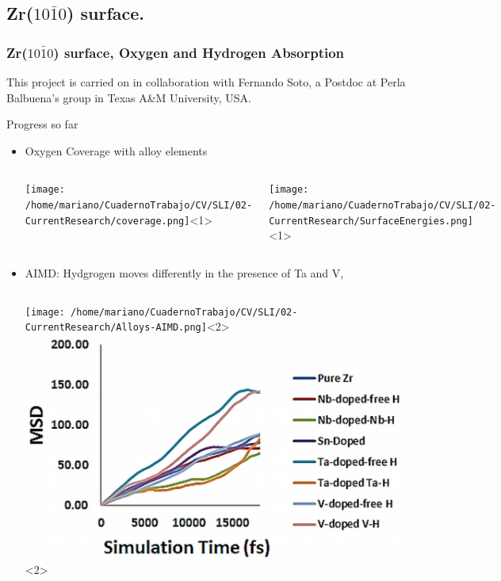 \subsection{Zr($10\bar{1}0$) surface.}
\begin{frame}[t]
\frametitle{Zr($10\bar{1}0$) surface, Oxygen and Hydrogen Absorption}

\small
  This project is carried on in collaboration with Fernando Soto, a Postdoc at 
  Perla Balbuena's group in Texas A\&M University, USA.
  \par
  \vspace{0.5cm}
  Progress so far
  \begin{itemize}
      \item<1-> Oxygen Coverage with alloy elements
	\begin{columns}[c]
	  \centering
	  \texttt{[image: /home/mariano/CuadernoTrabajo/CV/SLI/02-CurrentResearch/coverage.png]}<1>
	  \par
	  \centering
	  \texttt{[image: /home/mariano/CuadernoTrabajo/CV/SLI/02-CurrentResearch/SurfaceEnergies.png]}<1>
	  \par
	\end{columns}
      \item<2> AIMD: Hydgrogen moves differently in the presence of Ta and V,

	\begin{columns}
	  \texttt{[image: /home/mariano/CuadernoTrabajo/CV/SLI/02-CurrentResearch/Alloys-AIMD.png]}<2>
	\includegraphics[width=\textwidth]{./02-CurrentResearch/HydrogenMeanFreePaths.png}<2>
	\end{columns}
  \end{itemize}

\end{frame}
